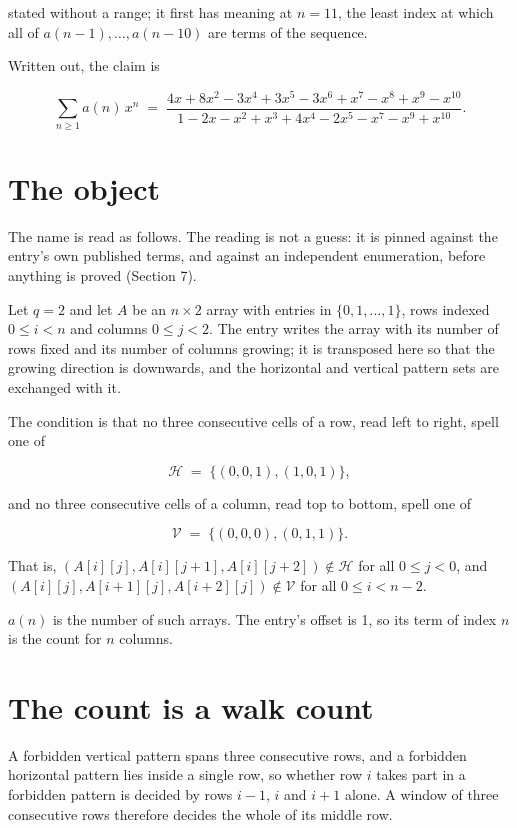 \documentclass[11pt]{article}
\theoremstyle{definition}
\begin{document}
stated without a range; it first has meaning at $n = 11$, the least index at which all of $a(n-1),\dots,a(n-10)$ are terms of the sequence.

Written out, the claim is

\[\sum_{n \ge 1} a(n)\,x^n \;=\; \frac{4x + 8x^{2} - 3x^{4} + 3x^{5} - 3x^{6} + x^{7} - x^{8} + x^{9} - x^{10}}{1 - 2x - x^{2} + x^{3} + 4x^{4} - 2x^{5} - x^{7} - x^{9} + x^{10}}.\]

\section{The object}

The name is read as follows. The reading is not a guess: it is pinned against the entry's own published terms, and against an independent enumeration, before anything is proved (Section 7).

Let $q = 2$ and let $A$ be an $n \times 2$ array with entries in $\{0,1,\dots,1\}$, rows indexed $0 \le i < n$ and columns $0 \le j < 2$. The entry writes the array with its number of rows fixed and its number of columns growing; it is transposed here so that the growing direction is downwards, and the horizontal and vertical pattern sets are exchanged with it.

The condition is that no three consecutive cells of a row, read left to right, spell one of

\[\mathcal{H} \;=\; \{(0,0,1), (1,0,1)\},\]

and no three consecutive cells of a column, read top to bottom, spell one of

\[\mathcal{V} \;=\; \{(0,0,0), (0,1,1)\}.\]

That is, $(A[i][j],A[i][j{+}1],A[i][j{+}2]) \notin \mathcal{H}$ for all $0 \le j < 0$, and $(A[i][j],A[i{+}1][j],A[i{+}2][j]) \notin \mathcal{V}$ for all $0 \le i < n-2$.

$a(n)$ is the number of such arrays. The entry's offset is 1, so its term of index $n$ is the count for $n$ columns.

\section{The count is a walk count}

A forbidden vertical pattern spans three consecutive rows, and a forbidden horizontal pattern lies inside a single row, so whether row $i$ takes part in a forbidden pattern is decided by rows $i-1$, $i$ and $i+1$ alone. A window of three consecutive rows therefore decides the whole of its middle row.
\end{document}

